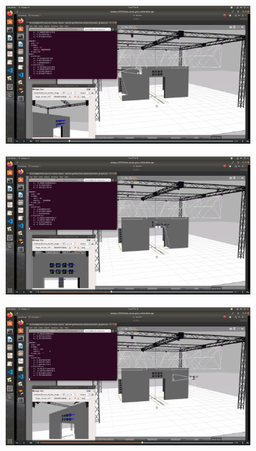 \documentclass[../Head/report.tex]{subfiles}
\begin{document}
\begin{figure}[H]
    \centering
    \begin{subfigure}[t]{.30\textwidth}
        \centering
        \includegraphics[width=\textwidth]{../Figures/GPS2Vision_pose_estimation_test/gps2vision_pose_estimation_one.png}
        \caption{}
        \label{fig:GPS2Vision_pose_estimation_one}
    \end{subfigure}
    \hspace{0.2em}
    \begin{subfigure}[t]{.30\textwidth}
        \centering
        \includegraphics[width=\textwidth]{../Figures/GPS2Vision_pose_estimation_test/gps2vision_pose_estimation_two.png}
        \caption{}
        \label{fig:GPS2Vision_pose_estimation_two}
    \end{subfigure}
        \hspace{0.2em}
    \begin{subfigure}[t]{.30\textwidth}
        \centering
        \includegraphics[width=\textwidth]{../Figures/GPS2Vision_pose_estimation_test/gps2vision_pose_estimation_three.png}

\end{subfigure}
\end{figure}
\end{document}
